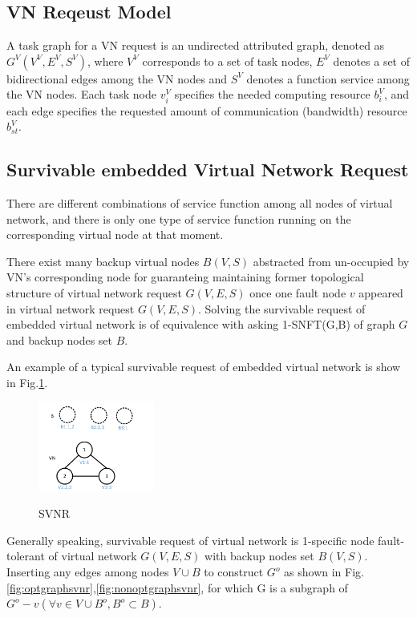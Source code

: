 \subsection{VN Reqeust Model}
A task graph for a VN request is an undirected attributed graph, denoted as $G^V (V^V,E^V,S^V )$, where $V^V$ corresponds to a set of task nodes, $E^V$ denotes a set of bidirectional edges among the VN nodes and $S^V$ denotes a function service among the VN nodes. Each task node $v_i^V$ specifies the needed computing resource $b_i^V$, and each edge specifies the requested amount of communication (bandwidth) resource $b_{st}^V$.

\subsection{Survivable embedded Virtual Network Request}

There are different combinations of service function among all nodes of virtual network, and there is only one type of service function running on the corresponding virtual node at that moment.

There exist many backup virtual nodes $B(V,S)$ abstracted from un-occupied by VN's corresponding node for guaranteing maintaining former topological structure of virtual network request $G(V,E,S)$ once one fault node $v$ appeared in virtual network request $G(V,E,S)$. Solving the survivable request of embedded virtual network is of equivalence with asking 1-SNFT(G,B) of graph $G$ and backup nodes set $B$.

An example of a typical survivable request of embedded virtual network is show in Fig.\ref{fig:svnr}.
\begin{figure}
\centering
\includegraphics[width=1.5in]{Fig/SVNR}\\
\caption{SVNR}\label{fig:svnr}
\end{figure}

Generally speaking, survivable request of virtual network is 1-specific node fault-tolerant of virtual network $G(V,E,S)$ with backup nodes set $B(V,S)$. Inserting any edges among nodes $V\cup B$ to construct $G^o$ as shown in Fig.\ref{fig:optgraphsvnr},\ref{fig:nonoptgraphsvnr}, for which G is a subgraph of $G^o-v(\forall v\in V\cup B^o,B^o\subset B)$.

